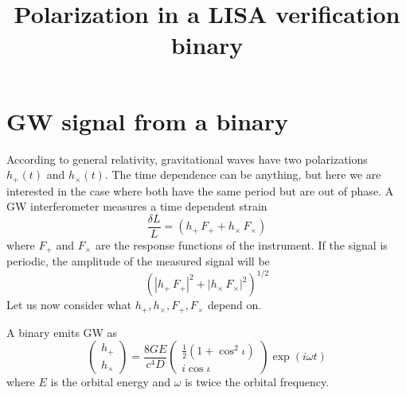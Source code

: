 \documentclass[10pt,a4paper]{article}
\title{Polarization in a LISA verification binary}
\begin{document}
\maketitle

\section{GW signal from a binary}

According to general relativity, gravitational waves have two
polarizations $h_+(t)$ and $h_\times(t)$.  The time dependence can be
anything, but here we are interested in the case where both have the
same period but are out of phase.  A GW interferometer measures a
time dependent strain
\begin{equation}
  \frac{\delta L}L = 
  \left( h_+ \, F_+ + h_\times \, F_\times \right)
\end{equation}
where $F_+$ and $F_\times$ are the response functions of the
instrument.  If the signal is periodic, the amplitude of the measured
signal will be
\begin{equation}
  \left(|h_+ \, F_+|^2 + |h_\times \, F_\times|^2 \right)^{1/2}
\end{equation}
Let us now consider what $h_+,h_\times,F_+,F_\times$ depend on.

A binary emits GW as
\begin{equation}
\begin{pmatrix}
  h_+\\h_\times
\end{pmatrix}
= \frac{8GE}{c^4 D}
\begin{pmatrix}
  \frac12(1+\cos^2\iota) \\
  i\cos\iota
\end{pmatrix}
\exp(i\omega t)
\end{equation}
where $E$ is the orbital energy and $\omega$ is twice the orbital
frequency.
\end{document}
